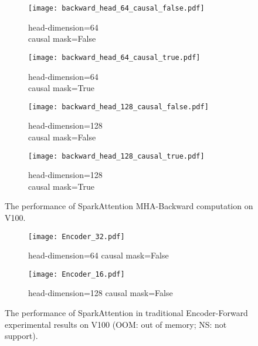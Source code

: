 \documentclass[10pt,twocolumn]{article}
\begin{document}
\begin{figure*}[t] \small
    \centering
    \begin{subfigure}[b]{0.24\textwidth}
        \texttt{[image: backward\_head\_64\_causal\_false.pdf]}
        \caption{head-dimension=64 \\ causal mask=False}
        \label{fig:subfig_backward-a}
    \end{subfigure}
    \hspace{0.0cm} %
    \begin{subfigure}[b]{0.24\textwidth}
        \texttt{[image: backward\_head\_64\_causal\_true.pdf]}
        \caption{head-dimension=64 \\ causal mask=True}
        \label{fig:subfig_backward-b}
    \end{subfigure}
    \hspace{0.0cm}
    \begin{subfigure}[b]{0.24\textwidth}
        \texttt{[image: backward\_head\_128\_causal\_false.pdf]}
        \caption{head-dimension=128 \\ causal mask=False}
        \label{fig:subfig_backward-c}
    \end{subfigure}
    \hspace{0.0cm}
    \begin{subfigure}[b]{0.24\textwidth}
        \texttt{[image: backward\_head\_128\_causal\_true.pdf]}
        \caption{head-dimension=128 \\ causal mask=True}
        \label{fig:subfig_backward-d}
    \end{subfigure}
    \caption{The performance of SparkAttention MHA-Backward computation on V100.}
    \label{fig:subfig_backward}
\end{figure*}

\begin{figure*}[t] \small
    \centering
    \begin{subfigure}[b]{0.45\textwidth}
        \texttt{[image: Encoder\_32.pdf]}
        \caption{head-dimension=64 causal mask=False}
        \label{fig:subfig_end2end-a}
    \end{subfigure}
    \hspace{1cm} %
    \begin{subfigure}[b]{0.45\textwidth}
        \texttt{[image: Encoder\_16.pdf]}
        \caption{head-dimension=128 causal mask=False}
        \label{fig:subfig_end2end-b}
    \end{subfigure}
    \caption{The performance of SparkAttention in traditional Encoder-Forward experimental results on V100 (OOM: out of memory; NS: not support).}
    \label{fig:subfig_end2end}
\end{figure*}
\end{document}
